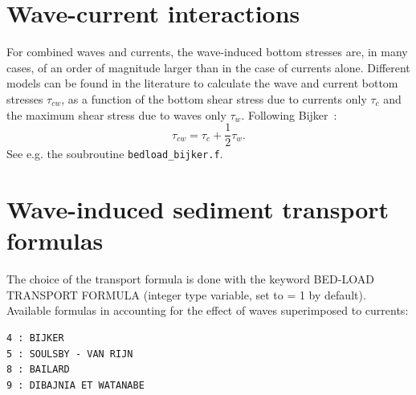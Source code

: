\section{Wave-current interactions}
For combined waves and currents, the wave-induced bottom
stresses are, in many cases, of an order of magnitude larger than in the case of currents
alone. Different models can be found in the literature to calculate the wave
and current bottom stresses $\tau_{cw}$, as a function of the bottom
shear stress due to currents only $\tau_c$ and the maximum shear
stress due to waves only $\tau_w$. Following Bijker~\cite{Bijker}:
\begin{equation}\label{eq:tauBijker}
\tau_{cw} = \tau_c + \frac{1}{2} \tau_w. 
\end{equation}
See e.g. the soubroutine \texttt{bedload\_bijker.f}.

\section{Wave-induced sediment transport formulas}
The choice of the transport formula is done with the keyword {\ttfamily BED-LOAD TRANSPORT FORMULA} (integer type variable, set to {\ttfamily = 1} by default). Available formulas in \sisyphe{} accounting for the effect of waves superimposed to currents:
\begin{lstlisting}[frame=trBL] 
4 : BIJKER 
5 : SOULSBY - VAN RIJN 
8 : BAILARD 
9 : DIBAJNIA ET WATANABE 
\end{lstlisting}

